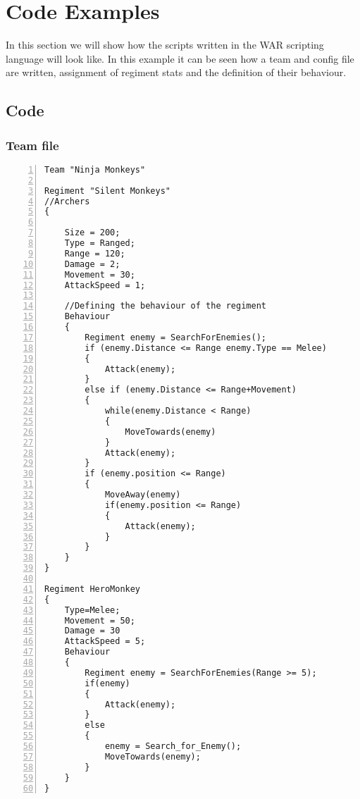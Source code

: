 \section{Code Examples}
	In this section we will show how the scripts written in the WAR scripting language will look like.
	In this example it can be seen how a team and config file are written, assignment of regiment stats and the definition of their behaviour.
	\subsection{Code}
		\subsubsection{Team file}
					\begin{lstlisting}[basicstyle=\small\sffamily,
					keywords={break,case,const,continue,default,else,enum,
					for,if,return,switch,while,do,long,void,int,float,double,
					char,struct,typedef,include,size\_t},
					keywordstyle={\color{blue}},
					comment={[l]{//}}, morecomment={[s]{/*}{*/}}, commentstyle=\itshape,
					columns={[l]flexible}, numbers=left, numberstyle=\tiny,
					frameround=fftt, frame=shadowbox, captionpos=b,
					caption={Team file of code example 3},
					label=LST:code31]
Team "Ninja Monkeys"

Regiment "Silent Monkeys"
//Archers
{
	
	Size = 200;
	Type = Ranged;
	Range = 120;
	Damage = 2;
	Movement = 30;
	AttackSpeed = 1;
	
	//Defining the behaviour of the regiment
	Behaviour
	{
		Regiment enemy = SearchForEnemies();
		if (enemy.Distance <= Range enemy.Type == Melee)
		{
			Attack(enemy);
		}
		else if (enemy.Distance <= Range+Movement)
		{
			while(enemy.Distance < Range)
			{
				MoveTowards(enemy)
			}
			Attack(enemy);
		}
		if (enemy.position <= Range)
		{
			MoveAway(enemy)
			if(enemy.position <= Range)
			{
				Attack(enemy);
			}
		}
	}
}

Regiment HeroMonkey
{
	Type=Melee;
	Movement = 50;
	Damage = 30
	AttackSpeed = 5;
	Behaviour
	{
		Regiment enemy = SearchForEnemies(Range >= 5);
		if(enemy)
		{
			Attack(enemy);
		}
		else
		{
			enemy = Search_for_Enemy();
			MoveTowards(enemy);
		}
	}
}
					\end{lstlisting}
